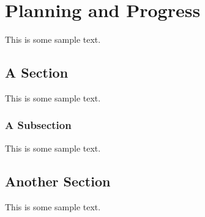 \chapter{Planning and Progress}

This is some sample text.

\section{A Section}

This is some sample text.

\subsection{A Subsection}

This is some sample text.

\section{Another Section}

This is some sample text.
